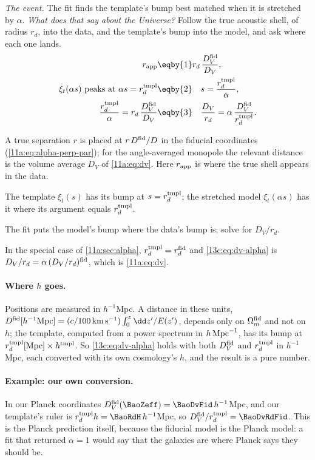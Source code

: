 \emph{The event.} The fit finds the template's bump best matched when it is stretched by
$\alpha$. \emph{What does that say about the Universe?} Follow the true acoustic shell,
of radius $r_d$, into the data, and the template's bump into the model, and ask where
each one lands.
\begin{align}
  r_{\rm app}
  &\eqby{1} r_d\,\frac{D_V^{\rm fid}}{D_V},
  \nonumber\\
  \xi_t(\alpha s)\ \text{peaks at}\ \alpha s=r_d^{\rm tmpl}
  &\eqby{2}\quad s=\frac{r_d^{\rm tmpl}}{\alpha},
  \nonumber\\
  \frac{r_d^{\rm tmpl}}{\alpha}=r_d\,\frac{D_V^{\rm fid}}{D_V}
  &\eqby{3}\quad
  \frac{D_V}{r_d}=\alpha\,\frac{D_V^{\rm fid}}{r_d^{\rm tmpl}} .
  \label{13c:eq:dv-alpha}
\end{align}
\begin{explain}
  \item A true separation $r$ is placed at $r\,D^{\rm fid}/D$ in the fiducial
        coordinates (\cref{11a:eq:alpha-perp-par}); for the angle-averaged monopole the
        relevant distance is the volume average $D_V$ of \eqref{11a:eq:dv}. Here
        $r_{\rm app}$ is where the true shell appears in the data.
  \item The template $\xi_t(s)$ has its bump at $s=r_d^{\rm tmpl}$; the stretched model
        $\xi_t(\alpha s)$ has it where its argument equals $r_d^{\rm tmpl}$.
  \item The fit puts the model's bump where the data's bump is; solve for $D_V/r_d$.
\end{explain}
In the special case of \cref{11a:sec:alpha}, $r_d^{\rm tmpl}=r_d^{\rm fid}$ and
\eqref{13c:eq:dv-alpha} is $D_V/r_d=\alpha\,(D_V/r_d)^{\rm fid}$, which is
\eqref{11a:eq:dv}.

\paragraph{Where $h$ goes.} Positions are measured in $h^{-1}$Mpc. A distance in these
units, $D^{\rm fid}[h^{-1}{\rm Mpc}]=(c/100\,{\rm km\,s^{-1}})\int_0^z\dd z'/E(z')$,
depends only on $\Omega_m^{\rm fid}$ and not on $h$; the template, computed from a power
spectrum in $h\,{\rm Mpc}^{-1}$, has its bump at $r_d^{\rm tmpl}[{\rm Mpc}]\times
h^{\rm tmpl}$. So \eqref{13c:eq:dv-alpha} holds with both $D_V^{\rm fid}$ and $r_d^{\rm
tmpl}$ in $h^{-1}$Mpc, each converted with its own cosmology's $h$, and the result is a
pure number.

\paragraph{Example: our own conversion.}
In our Planck coordinates $D_V^{\rm fid}(\BaoZeff)=\BaoDvFid\,h^{-1}$Mpc, and our
template's ruler is $r_d^{\rm tmpl}h=\BaoRdH\,h^{-1}$Mpc, so $D_V^{\rm fid}/r_d^{\rm
tmpl}=\BaoDvRdFid$. This is the Planck prediction itself, because the fiducial model
is the Planck model: a fit that returned $\alpha=1$ would say that the galaxies are
where Planck says they should be.

